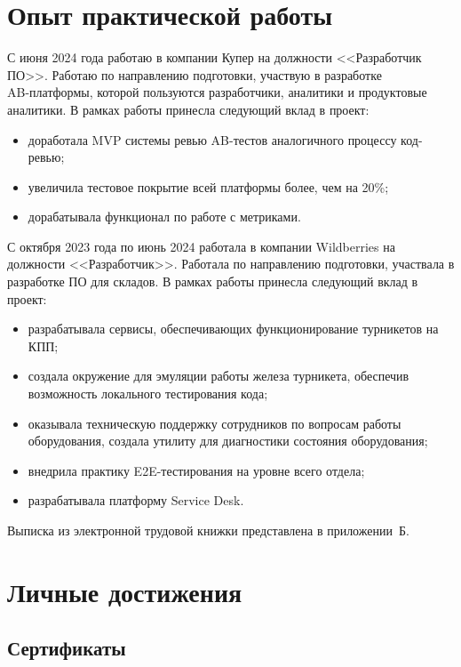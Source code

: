 \documentclass[14pt]{extarticle}
\begin{document}
\section{Опыт практической работы}

С июня 2024 года работаю в компании Купер на должности <<Разработчик ПО>>. Работаю по направлению подготовки, участвую в разработке \\ AB-платформы, которой пользуются разработчики, аналитики и продуктовые аналитики. В рамках работы принесла следующий вклад в проект:

\begin{itemize}
	\item доработала MVP системы ревью AB-тестов аналогичного процессу код-ревью;
	\item увеличила тестовое покрытие всей платформы более, чем на 20\%;
	\item дорабатывала функционал по работе с метриками.
\end{itemize}

С октября 2023 года по июнь 2024 работала в компании Wildberries на должности <<Разработчик>>. Работала по направлению подготовки, участвала в разработке ПО для складов. В рамках работы принесла следующий вклад в проект:

\begin{itemize}
	\item разрабатывала сервисы, обеспечивающих функционирование турникетов на КПП;
	\item создала окружение для эмуляции работы железа турникета, обеспечив возможность локального тестирования кода;
	\item оказывала техническую поддержку сотрудников по вопросам работы оборудования, создала утилиту для диагностики состояния оборудования;
	\item внедрила практику E2E-тестирования на уровне всего отдела;
	\item разрабатывала платформу Service Desk.

\end{itemize}

Выписка из электронной трудовой книжки представлена в приложении~Б.

\section{Личные достижения}

\subsection{Сертификаты}
\end{document}
